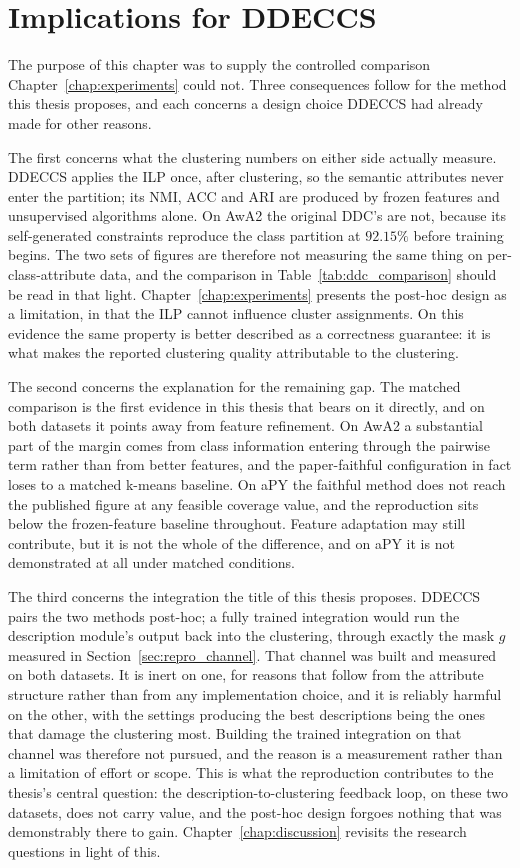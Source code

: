 \section{Implications for DDECCS}
\label{sec:repro_implications}

The purpose of this chapter was to supply the controlled comparison Chapter~\ref{chap:experiments} could not. Three consequences follow for the method this thesis proposes, and each concerns a design choice DDECCS had already made for other reasons.

The first concerns what the clustering numbers on either side actually measure. DDECCS applies the ILP once, after clustering, so the semantic attributes never enter the partition; its NMI, ACC and ARI are produced by frozen features and unsupervised algorithms alone. On AwA2 the original DDC's are not, because its self-generated constraints reproduce the class partition at $92.15\%$ before training begins. The two sets of figures are therefore not measuring the same thing on per-class-attribute data, and the comparison in Table~\ref{tab:ddc_comparison} should be read in that light. Chapter~\ref{chap:experiments} presents the post-hoc design as a limitation, in that the ILP cannot influence cluster assignments. On this evidence the same property is better described as a correctness guarantee: it is what makes the reported clustering quality attributable to the clustering.

The second concerns the explanation for the remaining gap. The matched comparison is the first evidence in this thesis that bears on it directly, and on both datasets it points away from feature refinement. On AwA2 a substantial part of the margin comes from class information entering through the pairwise term rather than from better features, and the paper-faithful configuration in fact loses to a matched k-means baseline. On aPY the faithful method does not reach the published figure at any feasible coverage value, and the reproduction sits below the frozen-feature baseline throughout. Feature adaptation may still contribute, but it is not the whole of the difference, and on aPY it is not demonstrated at all under matched conditions.

The third concerns the integration the title of this thesis proposes. DDECCS pairs the two methods post-hoc; a fully trained integration would run the description module's output back into the clustering, through exactly the mask $g$ measured in Section~\ref{sec:repro_channel}. That channel was built and measured on both datasets. It is inert on one, for reasons that follow from the attribute structure rather than from any implementation choice, and it is reliably harmful on the other, with the settings producing the best descriptions being the ones that damage the clustering most. Building the trained integration on that channel was therefore not pursued, and the reason is a measurement rather than a limitation of effort or scope. This is what the reproduction contributes to the thesis's central question: the description-to-clustering feedback loop, on these two datasets, does not carry value, and the post-hoc design forgoes nothing that was demonstrably there to gain. Chapter~\ref{chap:discussion} revisits the research questions in light of this.